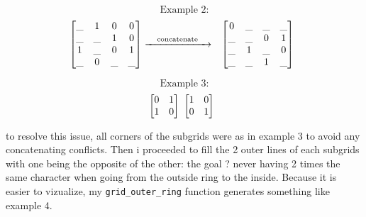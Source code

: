 \documentclass{article}
\begin{document}
\begin{minipage}{0.6\textwidth}
\[
\text{Example 2:}
\]
\[
\begin{array}{c@{\hspace{1em}}c@{\hspace{1em}}c}
\begin{bmatrix}
  \_ & 1 & 0 & 0 \\
  \_ & \_ & 1 & 0 \\
  1 & \_ & 0 & 1 \\
  \_ & 0 & \_ & \_ \\
\end{bmatrix}
\hfill
\xrightarrow{\hspace{1em}\text{concatenate}\hspace{1em}}
\hfill
&
\begin{bmatrix}
  0 & \_ & \_ & \_ \\
  \_ & \_ & 0 & 1 \\
  \_ & 1 & \_ & 0 \\
  \_ & \_ & 1 & \_ \\
\end{bmatrix}
\hfill
\end{array}
\]
\end{minipage}
\hfill
\begin{minipage}{0.25\textwidth}
\[
\text{Example 3:}
\]
\[
\begin{array}{c@{}c@{}c}
\begin{bmatrix}
  0 & 1  \\
  1 & 0  \\
\end{bmatrix}
\hfill
\end{array}
\hfill
\begin{array}{c@{\hspace{1em}}c}
\begin{bmatrix}
  1 & 0  \\
  0 & 1  \\
\end{bmatrix}
\hfill
\end{array}
\]
\end{minipage}

\vspace{1em}

to resolve this issue, all corners of the subgrids were as in example 3 to avoid any concatenating conflicts.
Then i proceeded to fill the 2 outer lines of each subgrids with one being the opposite of the other: the goal ? never having 2 times the same character when going from the outside ring to the inside. Because it is easier to vizualize, my \texttt{grid\_outer\_ring} function generates something like example 4.
\end{document}
